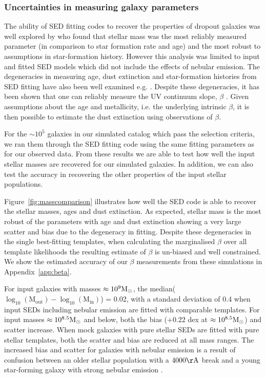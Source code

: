\subsubsection{Uncertainties in measuring galaxy parameters}
The ability of SED fitting codes to recover the properties of dropout galaxies was well explored by \citet{2010ApJ...725.1644L} who found that stellar mass was the most reliably measured parameter (in comparison to star formation rate and age) and the most robust to assumptions in star-formation history. However this analysis was limited to input and fitted SED models which did not include the effects of nebular emission. The degeneracies in measuring age, dust extinction and star-formation histories from SED fitting have also been well examined e.g. \citet{2010A&A...515A..73S}. Despite these degeneracies, it has been shown that one can reliably measure the UV continuum slope, $\beta$ \citep{2012ApJ...756..164F,2013MNRAS.429.2456R}. Given assumptions about the age and metallicity, i.e. the underlying intrinsic $\beta$, it is then possible to estimate the dust extinction using observations of $\beta$.

For the $\sim 10^5$ galaxies in our simulated catalog which pass the selection criteria, we ran them through the SED fitting code using the same fitting parameters as for our observed data. From these results we are able to test how well the input stellar masses are recovered for our simulated galaxies. In addition, we can also test the accuracy in recovering the other properties of the input stellar populations.

Figure~\ref{fig:masscomparison} illustrates how well the SED code is able to recover the stellar masses, ages and dust extinction. As expected, stellar mass is the most robust of the parameters with age and dust extinction showing a very large scatter and bias due to the degeneracy in fitting. Despite these degeneracies in the single best-fitting templates, when calculating the marginalised $\beta$ over all template likelihoods the resulting estimate of $\beta$ is un-biased and well constrained. We show the estimated accuracy of our $\beta$ measurements from these simulations in Appendix~\ref{app:beta}.

For input galaxies with masses $\approx 10^9 \rm{M}_{\odot}$, the median($\log_{10}(\text{M}_{\text{out}}) - \log_{10}(\text{M}_{\text{in}})$) = 0.02, with a standard deviation of 0.4 when input SEDs including nebular emission are fitted with comparable templates. For input masses $\approx 10^{8.5} \rm{M}_{\odot}$ and below, both the bias ($+0.22$ dex at $\approx 10^{8.5} \rm{M}_{\odot}$) and scatter increase.
When mock galaxies with pure stellar SEDs are fitted with pure stellar templates, both the scatter and bias are reduced at all mass ranges. The increased bias and scatter for galaxies with nebular emission is a result of confusion between an older stellar population with a $4000\rm{\AA}$ break and a young star-forming galaxy with strong nebular emission \citep{2009A&A...502..423S,2013MNRAS.429..302C}. 


